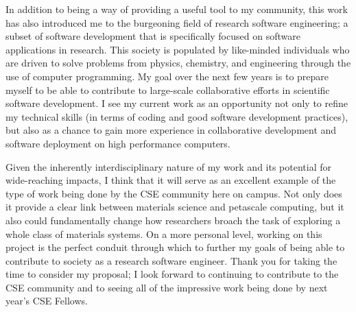 \documentclass[11pt]{article}
\begin{document}
In addition to being a way of providing a useful tool to my community, this work has also introduced me to the burgeoning field of research software engineering; a subset of software development that is specifically focused on software applications in research. This society is populated by like-minded individuals who are driven to solve problems from physics, chemistry, and engineering through the use of computer programming. My goal over the next few years is to prepare myself to be able to contribute to large-scale collaborative efforts in scientific software development. I see my current work as an opportunity not only to refine my technical skills (in terms of coding and good software development practices), but also as a chance to gain more experience in collaborative development and software deployment on high performance computers.

Given the inherently interdisciplinary nature of my work and its potential for wide-reaching impacts, I think that it will serve as an excellent example of the type of work being done by the CSE community here on campus. Not only does it provide a clear link between materials science and petascale computing, but it also could fundamentally change how researchers broach the task of exploring a whole class of materials systems. On a more personal level, working on this project is the perfect conduit through which to further my goals of being able to contribute to society as a research software engineer. Thank you for taking the time to consider my proposal; I look forward to continuing to contribute to the CSE community and to seeing all of the impressive work being done by next year's CSE Fellows.



\end{document}
